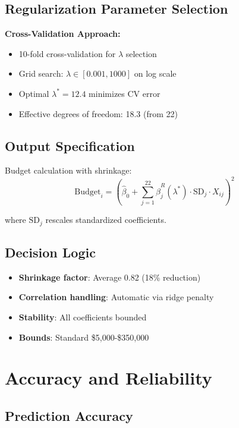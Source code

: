 \subsection{Regularization Parameter Selection}

\textbf{Cross-Validation Approach:}
\begin{itemize}
    \item 10-fold cross-validation for $\lambda$ selection
    \item Grid search: $\lambda \in [0.001, 1000]$ on log scale
    \item Optimal $\lambda^* = 12.4$ minimizes CV error
    \item Effective degrees of freedom: 18.3 (from 22)
\end{itemize}

\subsection{Output Specification}

Budget calculation with shrinkage:
\begin{equation}
\text{Budget}_i = \left(\hat{\beta}_0 + \sum_{j=1}^{22} \hat{\beta}_j^R(\lambda^*) \cdot \text{SD}_j \cdot X_{ij}\right)^2
\end{equation}

where $\text{SD}_j$ rescales standardized coefficients.

\subsection{Decision Logic}

\begin{itemize}
    \item \textbf{Shrinkage factor}: Average 0.82 (18\% reduction)
    \item \textbf{Correlation handling}: Automatic via ridge penalty
    \item \textbf{Stability}: All coefficients bounded
    \item \textbf{Bounds}: Standard \$5,000-\$350,000
\end{itemize}

\section{Accuracy and Reliability}

\subsection{Prediction Accuracy}

